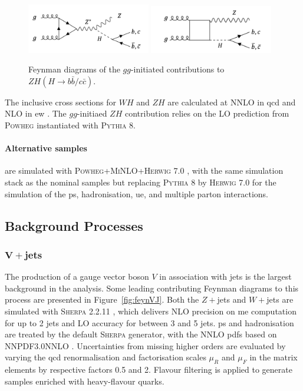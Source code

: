 \begin{figure}[h!]
  \center
  \includegraphics[width=0.48\textwidth]{Images/VH/Feynman/vh2order.png}
  \includegraphics[width=0.48\textwidth]{Images/VH/Feynman/vh3order.png}
  \caption{Feynman diagrams of the $gg$-initiated contributions to $ZH(H\rightarrow b\bar{b}/c\bar{c})$.} 
  \label{fig:feynnloVH}
\end{figure}

The inclusive cross sections for $WH$ and $ZH$ are calculated at NNLO in \gls{qcd} \cite{BREIN2004149} and NLO in \gls{ew} \cite{PDFLHCrun2}. The $gg$-initiaed $ZH$ contribution relies on the LO prediction from \textsc{Powheg} instantiated with \textsc{Pythia} 8.

\paragraph{Alternative samples} are simulated with \textsc{Powheg}+\textsc{MiNLO}+\textsc{Herwig} 7.0 \cite{bellm2017herwig}, with the same simulation stack as the nominal samples but replacing \textsc{Pythia} 8 by \textsc{Herwig} 7.0 for the simulation of the \gls{ps}, hadronisation, \gls{ue}, and multiple parton interactions.

\subsection{Background Processes}
\subsubsection{$\boldsymbol{V+}$jets}
The production of a gauge vector boson $V$ in association with jets is the largest background in the analysis. Some leading contributing Feynman diagrams to this process are presented in Figure~\ref{fig:feynVJ}. Both the $Z+$jets and $W+$jets are simulated with \textsc{Sherpa} 2.2.11 \cite{10.21468/SciPostPhys.7.3.034}, which delivers NLO precision on \gls{me} computation for up to 2 jets and LO accuracy for between 3 and 5 jets. \gls{ps} and hadronisation are treated by the default \textsc{Sherpa} generator, with the NNLO \glspl{pdf} based on NNPDF3.0NNLO \cite{PDFLHCrun2}. Uncertainties from missing higher orders are evaluated by varying the \gls{qcd} renormalisation and factorisation scales $\mu_R$ and $\mu_F$ in the matrix elements by respective factors 0.5 and 2. Flavour filtering is applied to generate samples enriched with heavy-flavour quarks.

